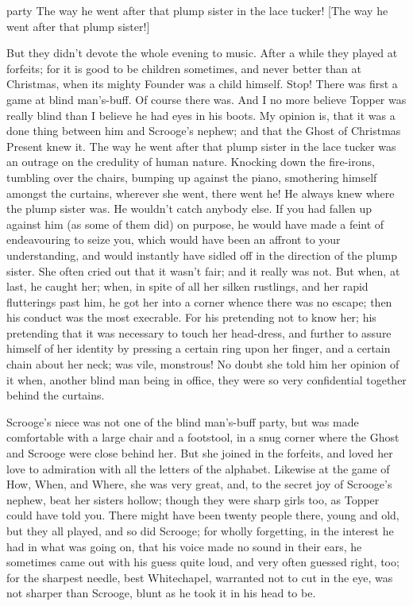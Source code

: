 \begin{colorbigpic}
	[1.15]
	{party}
	{The way he went after that plump sister in the lace tucker!}
	[The way he went after that plump sister!]
\end{colorbigpic}

But they didn't devote the whole evening to music. After a while they played at forfeits; for it is good to be children sometimes, and never better than at Christmas, when its mighty Foun\-der was a child himself. Stop! There was first a game at blind man's-buff. Of course there was. And I no more believe Topper was really blind than I believe he had eyes in his boots. My opinion is, that it was a done thing between him and Scrooge's nephew; and that the Ghost of Christmas Present knew it. The way he went after that plump sister in the lace tucker was an outrage on the credulity of human nature. Knocking down the fire-irons, tumbling over the chairs, bumping up against the piano, smothering himself amongst the curtains, wherever she went, there went he! He always knew where the plump sister was. He wouldn't catch anybody else. If you had fallen up against him (as some of them did) on purpose, he would have made a feint of endeavouring to seize you, which would have been an affront to your understanding, and would instantly have sidled off in the direction of the plump sister. She often cried out that it wasn't fair; and it really was not. But when, at last, he caught her; when, in spite of all her silken rustlings, and her rapid flutterings past him, he got her into a corner whence there was no escape; then his conduct was the most execrable. For his pretending not to know her; his pretending that it was necessary to touch her head-dress, and further to assure himself of her identity by pressing a certain ring upon her finger, and a certain chain about her neck; was vile, monstrous! No doubt she told him her opinion of it when, another blind man being in office, they were so very confidential together behind the curtains.

Scrooge's niece was not one of the blind man's-buff party, but was made comfortable with a large chair and a footstool, in a snug corner where the Ghost and Scrooge were close behind her. But she joined in the forfeits, and loved her love to admiration with all the letters of the alphabet. Likewise at the game of How, When, and Where, she was very great, and, to the secret joy of Scrooge's nephew, beat her sisters hollow; though they were sharp girls too, as Topper could have told you. There might have been twenty people there, young and old, but they all played, and so did Scrooge; for wholly forgetting, in the interest he had in what was going on, that his voice made no sound in their ears, he sometimes came out with his guess quite loud, and very often guessed right, too; for the sharpest needle, best Whitechapel, warranted not to cut in the eye, was not sharper than Scrooge, blunt as he took it in his head to be.

